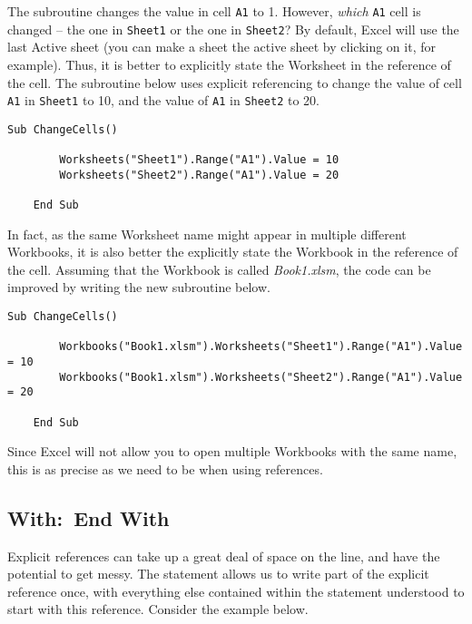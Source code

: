 \documentclass[11pt]{article}%
\begin{document}
The subroutine changes the value in cell \texttt{A1} to 1. However, \textit{which} \texttt{A1} cell is changed -- the one in \texttt{Sheet1} or the one in \texttt{Sheet2}? By default, Excel will use the last Active sheet (you can make a sheet the active sheet by clicking on it, for example). Thus, it is better to explicitly state the Worksheet in the reference of the cell. The subroutine below uses explicit referencing to change the value of cell \texttt{A1} in \texttt{Sheet1} to 10, and the value of \texttt{A1} in \texttt{Sheet2} to 20.\\

\begin{lstlisting}[style=A]
    Sub ChangeCells()

        Worksheets("Sheet1").Range("A1").Value = 10
        Worksheets("Sheet2").Range("A1").Value = 20

    End Sub
\end{lstlisting}

In fact, as the same Worksheet name might appear in multiple different Workbooks, it is also better the explicitly state the Workbook in the reference of the cell. Assuming that the Workbook is called \textit{Book1.xlsm}, the code can be improved by writing the new subroutine below.\\

\begin{lstlisting}[style=A]
    Sub ChangeCells()

        Workbooks("Book1.xlsm").Worksheets("Sheet1").Range("A1").Value = 10
        Workbooks("Book1.xlsm").Worksheets("Sheet2").Range("A1").Value = 20

    End Sub
\end{lstlisting}

Since Excel will not allow you to open multiple Workbooks with the same name, this is as precise as we need to be when using references.


\subsection{With:~End With}

Explicit references can take up a great deal of space on the line, and have the potential to get messy. The  statement allows us to write part of the explicit reference once, with everything else contained within the  statement understood to start with this reference. Consider the example below.\\
\end{document}
